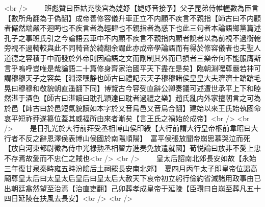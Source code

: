 <br />
　　班彪贊曰臣姑充後宫為媫妤【媫妤音接予】父子昆弟侍帷幄數為臣言【數所角翻為于偽翻】成帝善修容儀升車正立不内顧不疾言不親指【師古曰不内顧者儼然端嚴不迴眄也不疾言者為輕肆也不親指者為惑下也此三句者本論語鄉黨篇述孔子之事班氏引之今論語云車中不内顧不疾言不親指内顧者說者以為前視不過衡軶旁視不過輢較與此不同輢音於綺翻余謂此亦成帝學論語而有得於修容儀者也夫聖人道德之容積于中而發於外帝則因論語之文而剛制其外而已損者三樂帝何不能服膺斯言乎嗚呼豈唯是哉論語二十篇修身齊家治國平天下盡在是矣】臨朝淵嘿尊嚴若神可謂穆穆天子之容矣【淵深嘿静也師古曰禮記云天子穆穆諸侯皇皇大夫濟濟士蹌蹌毛晃曰穆穆和敬貌朝直遥翻下同】博覽古今容受直辭公卿奏議可述遭世承平上下和睦然湛于酒色【師古曰湛讀曰耽孔穎達曰耽者過禮之樂】趙氏亂内外家擅朝言之可為於邑【師古曰於邑短氣貌讀如本字於又音烏邑又音烏合翻】建始以來王氏始執國命哀平短祚莽遂簒位蓋其威福所由來者漸矣【言王氏之禍始於成帝】<br />
<br />
　　是日孔光於大行前拜受丞相博山侯印綬【大行前謂大行皇帝柩前韋昭曰大行者不反之辭恩澤侯表博山侯國於南陽順陽】　富平侯張放聞帝崩思慕哭泣而死【放自河東都尉徵為侍中光禄勲丞相翟方進奏免放遣就國】荀悦論曰放非不愛上忠不存焉故愛而不忠仁之賊也<br />
<br />
　　皇太后詔南北郊長安如故【永始三年復甘泉秦畤雍五畤汾隂后土祠罷長安南北郊】　夏四月丙午太子即皇帝位謁高廟尊皇太后曰太皇太后皇后曰皇太后大赦天下哀帝初立躬行儉約省減諸用政事由已出朝廷翕然望至治焉【治直吏翻】己卯葬孝成皇帝于延陵【臣瓚曰自崩至葬凡五十四日延陵在扶風去長安】<br />
<br />
